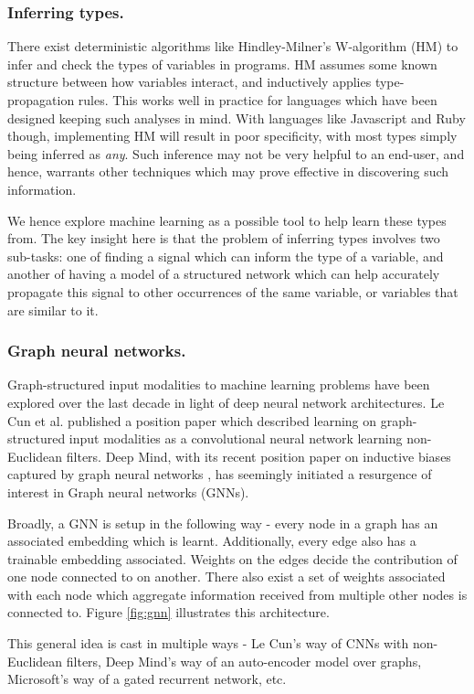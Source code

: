 \subsubsection{Inferring types.}
There exist deterministic algorithms like Hindley-Milner's W-algorithm (HM) to infer and check the types of variables in programs. HM assumes some known structure between how variables interact, and inductively applies type-propagation rules. This works well in practice for languages which have been designed keeping such analyses in mind. With languages like Javascript and Ruby though, implementing HM will result in poor specificity, with most types simply being inferred as \textit{any}. Such inference may not be very helpful to an end-user, and hence, warrants other techniques which may prove effective in discovering such information.

We hence explore machine learning as a possible tool to help learn these types from. The key insight here is that the problem of inferring types involves two sub-tasks: one of finding a signal which can inform the type of a variable, and another of having a model of a structured network which can help accurately propagate this signal to other occurrences of the same variable, or variables that are similar to it.

\subsubsection{Graph neural networks.}
Graph-structured input modalities to machine learning problems have been explored over the last decade in light of deep neural network architectures. Le Cun et al. published a position paper \cite{} which described learning on graph-structured input modalities as a convolutional neural network learning non-Euclidean filters. Deep Mind, with its recent position paper on inductive biases captured by graph neural networks \cite{}, has seemingly initiated a resurgence of interest in Graph neural networks (GNNs).

Broadly, a GNN is setup in the following way - every node in a graph has an associated embedding which is learnt. Additionally, every edge also has a trainable embedding associated. Weights on the edges decide the contribution of one node connected to on another. There also exist a set of weights associated with each node which aggregate information received from multiple other nodes is connected to. Figure \ref{fig:gnn} illustrates this architecture.

This general idea is cast in multiple ways - Le Cun's way of CNNs with non-Euclidean filters, Deep Mind's way of an auto-encoder model over graphs, Microsoft's way of a gated recurrent network, etc. 

